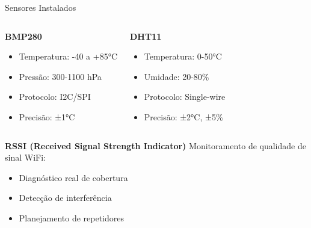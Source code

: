 \documentclass[12pt,aspectratio=16:9]{beamer}
\begin{document}
\begin{frame}{Sensores Instalados}
    \begin{columns}
        \begin{block}{\textbf{BMP280}}
            \begin{itemize}
                \item Temperatura: -40 a +85°C
                \item Pressão: 300-1100 hPa
                \item Protocolo: I2C/SPI
                \item Precisão: ±1°C
            \end{itemize}
        \end{block}
        
        \begin{block}{\textbf{DHT11}}
            \begin{itemize}
                \item Temperatura: 0-50°C
                \item Umidade: 20-80\%
                \item Protocolo: Single-wire
                \item Precisão: ±2°C, ±5\%
            \end{itemize}
        \end{block}
    \end{columns}
    
    \vspace{0.8cm}
    
    \begin{block}{\textbf{RSSI (Received Signal Strength Indicator)}}
        Monitoramento de qualidade de sinal WiFi:
        \begin{itemize}
            \item Diagnóstico real de cobertura
            \item Detecção de interferência
            \item Planejamento de repetidores
        \end{itemize}
    \end{block}
\end{frame}
\end{document}
